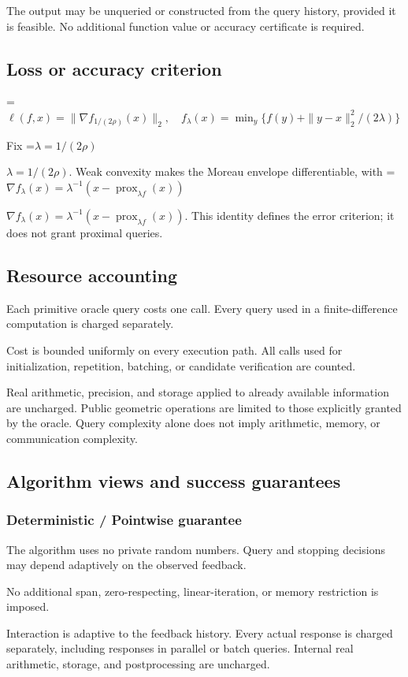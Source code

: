 \documentclass[10pt,a4paper]{article}
\newcommand{\AtlasMath}[1]{\par\begingroup\centering\setbox0=\hbox{$\displaystyle #1$}\ifdim\wd0>1.4\linewidth\typeout{ATLAS WIDE FORMULA: \the\wd0}\fi\ifdim\wd0>\linewidth\resizebox{\linewidth}{!}{\box0}\else\box0\fi\par\endgroup}
\newcommand{\AtlasInlineMath}[1]{\begingroup\setbox0=\hbox{$#1$}\ifdim\wd0>.4\linewidth\endgroup\AtlasMath{#1}\else\endgroup$#1$\fi}
\begin{document}
The output may be unqueried or constructed from the query history, provided it is feasible. No additional function value or accuracy certificate is required.

\subsection{Loss or accuracy criterion}

\AtlasMath{\ell(f,x)=\|\nabla f_{1/(2\rho)}(x)\|_2,\quad f_\lambda(x)=\min_y\{f(y)+\|y-x\|_2^2/(2\lambda)\}}


Fix \AtlasInlineMath{\lambda=1/(2\rho)}. Weak convexity makes the Moreau envelope differentiable, with \AtlasInlineMath{\nabla f_\lambda(x)=\lambda^{-1}(x-\operatorname{prox}_{\lambda f}(x))}. This identity defines the error criterion; it does not grant proximal queries.

\subsection{Resource accounting}
Each primitive oracle query costs one call. Every query used in a finite-difference computation is charged separately.

Cost is bounded uniformly on every execution path. All calls used for initialization, repetition, batching, or candidate verification are counted.

Real arithmetic, precision, and storage applied to already available information are uncharged. Public geometric operations are limited to those explicitly granted by the oracle. Query complexity alone does not imply arithmetic, memory, or communication complexity.

\subsection{Algorithm views and success guarantees}
\subsubsection{Deterministic / Pointwise guarantee}
The algorithm uses no private random numbers. Query and stopping decisions may depend adaptively on the observed feedback.

No additional span, zero-respecting, linear-iteration, or memory restriction is imposed.

Interaction is adaptive to the feedback history. Every actual response is charged separately, including responses in parallel or batch queries. Internal real arithmetic, storage, and postprocessing are uncharged.
\end{document}
